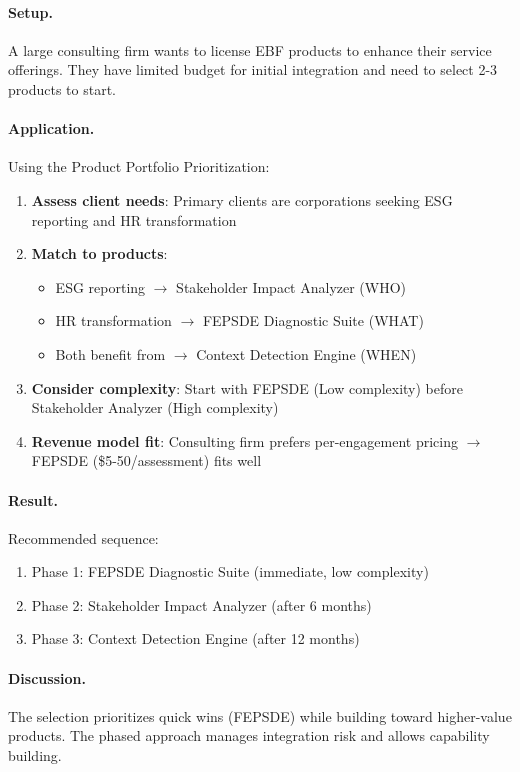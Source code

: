\paragraph{Setup.} A large consulting firm wants to license EBF products to enhance their service offerings. They have limited budget for initial integration and need to select 2-3 products to start.

\paragraph{Application.} Using the Product Portfolio Prioritization:

\begin{enumerate}
\item \textbf{Assess client needs}: Primary clients are corporations seeking ESG reporting and HR transformation
\item \textbf{Match to products}:
    \begin{itemize}
    \item ESG reporting $\to$ Stakeholder Impact Analyzer (WHO)
    \item HR transformation $\to$ FEPSDE Diagnostic Suite (WHAT)
    \item Both benefit from $\to$ Context Detection Engine (WHEN)
    \end{itemize}
\item \textbf{Consider complexity}: Start with FEPSDE (Low complexity) before Stakeholder Analyzer (High complexity)
\item \textbf{Revenue model fit}: Consulting firm prefers per-engagement pricing $\to$ FEPSDE (\$5-50/assessment) fits well
\end{enumerate}

\paragraph{Result.} Recommended sequence:
\begin{enumerate}
\item Phase 1: FEPSDE Diagnostic Suite (immediate, low complexity)
\item Phase 2: Stakeholder Impact Analyzer (after 6 months)
\item Phase 3: Context Detection Engine (after 12 months)
\end{enumerate}

\paragraph{Discussion.} The selection prioritizes quick wins (FEPSDE) while building toward higher-value products. The phased approach manages integration risk and allows capability building.


